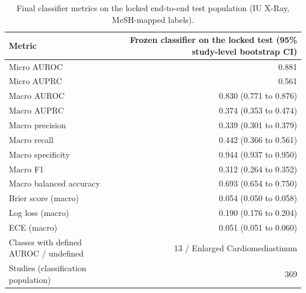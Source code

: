 \begin{table}[t]
\centering
\scriptsize
\begin{tabular}{lr}
\hline
Metric & Frozen classifier on the locked test (95\% study-level bootstrap CI) \\
\hline
Micro AUROC & 0.881 \\
Micro AUPRC & 0.561 \\
Macro AUROC & 0.830 (0.771 to 0.876) \\
Macro AUPRC & 0.374 (0.353 to 0.474) \\
Macro precision & 0.339 (0.301 to 0.379) \\
Macro recall & 0.442 (0.366 to 0.561) \\
Macro specificity & 0.944 (0.937 to 0.950) \\
Macro F1 & 0.312 (0.264 to 0.352) \\
Macro balanced accuracy & 0.693 (0.654 to 0.750) \\
Brier score (macro) & 0.054 (0.050 to 0.058) \\
Log loss (macro) & 0.190 (0.176 to 0.204) \\
ECE (macro) & 0.051 (0.051 to 0.060) \\
Classes with defined AUROC / undefined & 13 / Enlarged Cardiomediastinum \\
Studies (classification population) & 369 \\
\hline
\end{tabular}
\caption{Final classifier metrics on the locked end-to-end test population (IU X-Ray, MeSH-mapped labels).}
\label{tab:table2_final_classifier_metrics}
\end{table}
